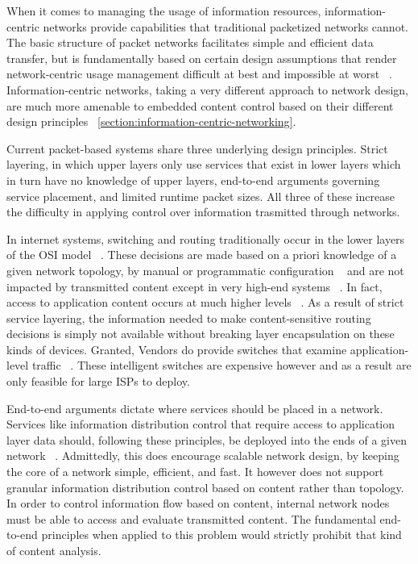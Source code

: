 \label{section:capabilities}
When it comes to managing the usage of information resources,  information-centric networks provide capabilities that traditional packetized networks cannot.  The basic structure of packet networks facilitates simple and efficient data transfer, but is fundamentally based on certain design assumptions that render network-centric usage management difficult at best and impossible at worst ~\cite{Cl:88,SaReCl:84}.  Information-centric networks, taking a very different approach to network design, are much more amenable to embedded content control based on their different design principles ~\ref{section:information-centric-networking}.

Current packet-based systems share three underlying design principles.  Strict layering, in which upper layers only use services that exist in lower layers which in turn have no knowledge of upper layers, end-to-end arguments governing service placement, and limited runtime packet sizes.  All three of these increase the difficulty in applying control over information trasmitted through networks.

In internet systems, switching and routing traditionally occur in the lower layers of the OSI model ~\cite{Tanenbaum:1985:CN:536716}.  These decisions are made based on a priori knowledge of a given network topology, by manual or programmatic configuration ~\cite{proposal:openflow} and are not impacted by transmitted content except in very high-end systems ~\cite{cisco-6500}.  In fact, access to application content occurs at much higher levels ~\cite{Tanenbaum:1985:CN:536716}.  As a result of strict service layering, the information needed to make content-sensitive routing decisions is simply not available without breaking layer encapsulation on these kinds of devices.  Granted, Vendors do provide switches that examine application-level traffic ~\cite{cisco-6500}.  These intelligent switches are expensive however and as a result are only feasible for large ISPs to deploy. 

End-to-end arguments dictate where services should be placed in a network.  Services like information distribution control that require access to application layer data should, following these principles, be deployed into the ends of a given network ~\cite{SaReCl:84}.  Admittedly, this does encourage scalable network design, by keeping the core of a network simple, efficient, and fast. It however does not support granular information distribution control based on content rather than topology.  In order to control information flow based on content, internal network nodes must be able to access and evaluate transmitted content.  The fundamental end-to-end principles when applied to this problem would strictly prohibit that kind of content analysis.

